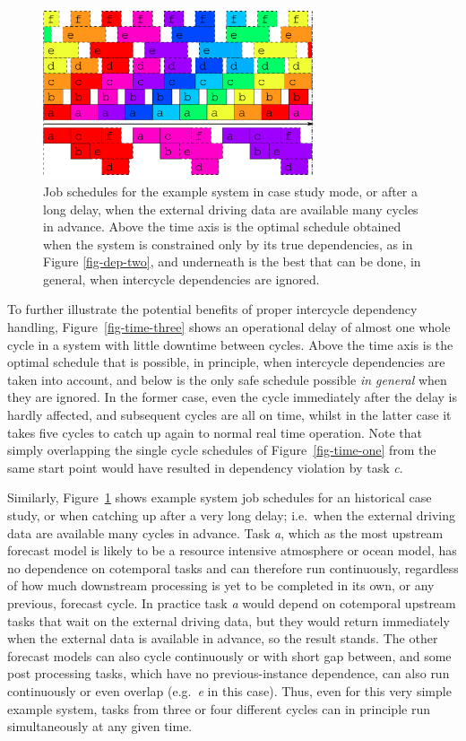 \documentclass[11pt,a4paper]{article}
\begin{document}
\begin{figure} \label{fig-time-two}
    \begin{center} 
        \includegraphics[width=8cm]{inkscape-svg/timeline-two}
    \end{center} 
    \caption[Optimal job schedule when all external data is
    available]{\small Job schedules for the example system in case study
    mode, or after a long delay, when the external driving data are
    available many cycles in advance. Above the time axis is the optimal
    schedule obtained when the system is constrained only by its true
    dependencies, as in Figure \ref{fig-dep-two}, and underneath is
    the best that can be done, in general, when intercycle dependencies
    are ignored.} 
\end{figure} 

To further illustrate the potential benefits of proper intercycle
dependency handling, Figure~\ref{fig-time-three} shows an operational
delay of almost one whole cycle in a system with little downtime between
cycles. Above the time axis is the optimal schedule that is possible, in
principle, when intercycle dependencies are taken into account, and
below is the only safe schedule possible {\em in general} when they are
ignored.  In the former case, even the cycle immediately after the delay
is hardly affected, and subsequent cycles are all on time, whilst in the
latter case it takes five cycles to catch up again to normal real time
operation. Note that simply overlapping the single cycle schedules of
Figure~\ref{fig-time-one} from the same start point would have resulted
in dependency violation by task {\em c}.

Similarly, Figure~\ref{fig-time-two} shows example system job schedules
for an historical case study, or when catching up after a very long
delay; i.e.\ when the external driving data are available many cycles in
advance.  Task {\em a}, which as the most upstream forecast model is
likely to be a resource intensive atmosphere or ocean model, has no
dependence on cotemporal tasks and can therefore run continuously,
regardless of how much downstream processing is yet to be completed in
its own, or any previous, forecast cycle. In practice task {\em a} would
depend on cotemporal upstream tasks that wait on the external driving
data, but they would return immediately when the external data is
available in advance, so the result stands. The other forecast models
can also cycle continuously or with short gap between, and some post
processing tasks, which have no previous-instance dependence, can also
run continuously or even overlap (e.g.\ {\em e} in this case).  Thus,
even for this very simple example system, tasks from three or four
different cycles can in principle run simultaneously at any given time. 
\end{document}
